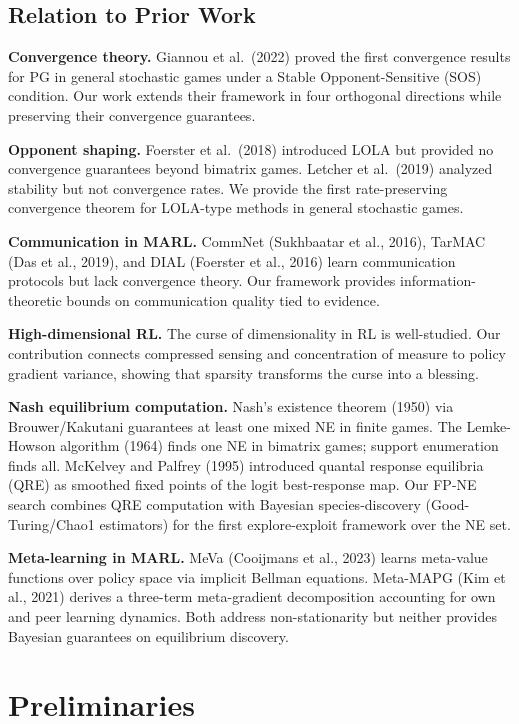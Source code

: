 \documentclass[11pt,a4paper]{article}
\begin{document}
\subsection{Relation to Prior Work}

\textbf{Convergence theory.}
Giannou et al.\ (2022) proved the first convergence results for
PG in general stochastic games under a Stable Opponent-Sensitive (SOS)
condition. Our work extends their framework in four orthogonal
directions while preserving their convergence guarantees.

\textbf{Opponent shaping.}
Foerster et al.\ (2018) introduced LOLA but provided no convergence
guarantees beyond bimatrix games. Letcher et al.\ (2019) analyzed
stability but not convergence rates. We provide the first rate-preserving
convergence theorem for LOLA-type methods in general stochastic games.

\textbf{Communication in MARL.}
CommNet (Sukhbaatar et al., 2016), TarMAC (Das et al., 2019), and
DIAL (Foerster et al., 2016) learn communication protocols but lack
convergence theory. Our framework provides information-theoretic bounds
on communication quality tied to evidence.

\textbf{High-dimensional RL.}
The curse of dimensionality in RL is well-studied. Our contribution
connects compressed sensing and concentration of measure to policy
gradient variance, showing that sparsity transforms the curse into
a blessing.

\textbf{Nash equilibrium computation.}
Nash's existence theorem (1950) via Brouwer/Kakutani guarantees at
least one mixed NE in finite games. The Lemke-Howson algorithm (1964)
finds one NE in bimatrix games; support enumeration finds all.
McKelvey and Palfrey (1995) introduced quantal response equilibria
(QRE) as smoothed fixed points of the logit best-response map.
Our FP-NE search combines QRE computation with Bayesian species-discovery
(Good-Turing/Chao1 estimators) for the first explore-exploit framework
over the NE set.

\textbf{Meta-learning in MARL.}
MeVa (Cooijmans et al., 2023) learns meta-value functions over policy
space via implicit Bellman equations. Meta-MAPG (Kim et al., 2021)
derives a three-term meta-gradient decomposition accounting for
own and peer learning dynamics. Both address non-stationarity but
neither provides Bayesian guarantees on equilibrium discovery.


\section{Preliminaries}
\end{document}

